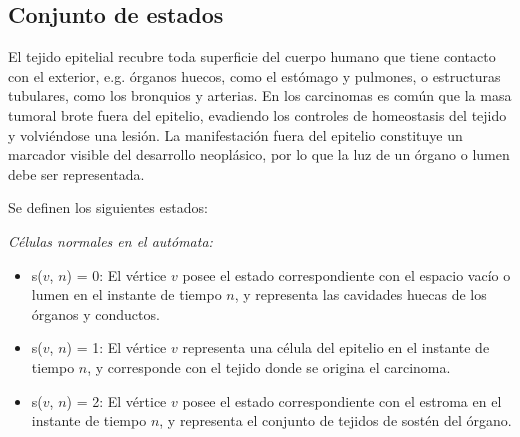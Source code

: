 \documentclass[12pt]{amsart}
\begin{document}
\newpage
\subsection{Conjunto de estados}
El tejido epitelial recubre toda superficie del cuerpo humano que tiene contacto con el exterior, e.g. \'organos huecos, como el est\'omago y pulmones, o estructuras tubulares, como los bronquios y arterias. En los carcinomas es com\'un que la masa tumoral brote fuera del epitelio, evadiendo los controles de homeostasis del tejido y volvi\'endose una lesi\'on. La manifestaci\'on fuera del epitelio constituye un marcador visible del desarrollo neopl\'asico, por lo que la luz de un \'organo o lumen debe ser representada.

Se definen los siguientes estados:

{\it C\'elulas normales en el aut\'omata:}  
\begin{itemize}
\item s($v$, $n$) = 0: El v\'ertice $v$ posee el estado correspondiente con el espacio vac\'io o lumen en el instante de tiempo $n$, y representa las cavidades huecas de los \'organos y conductos.
\item s($v$, $n$) = 1: El v\'ertice $v$ representa una c\'elula del epitelio en el instante de tiempo $n$, y corresponde con el tejido donde se origina el carcinoma.
\item s($v$, $n$) = 2: El v\'ertice $v$ posee el estado correspondiente con el estroma en el instante de tiempo $n$, y representa el conjunto de tejidos de sost\'en del \'organo.
\end{itemize}
\end{document}
